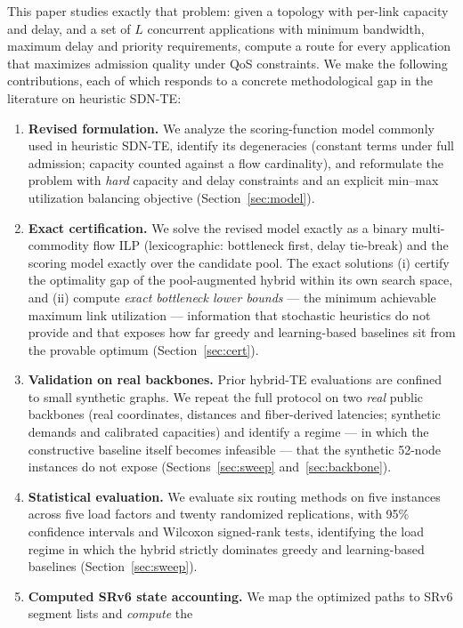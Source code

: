 \documentclass[journal]{IEEEtran}
\begin{document}
This paper studies exactly that problem: given a topology with per-link
capacity and delay, and a set of $L$ concurrent applications with minimum
bandwidth, maximum delay and priority requirements, compute a route for
every application that maximizes admission quality under QoS constraints.
We make the following contributions, each of which responds to a concrete
methodological gap in the literature on heuristic SDN-TE:
\begin{enumerate}
\item \textbf{Revised formulation.} We analyze the scoring-function model
commonly used in heuristic SDN-TE, identify its degeneracies (constant terms
under full admission; capacity counted against a flow cardinality), and
reformulate the problem with \emph{hard} capacity and delay constraints and
an explicit min--max utilization balancing objective
(Section~\ref{sec:model}).
\item \textbf{Exact certification.} We solve the revised model exactly as a
binary multi-commodity flow ILP (lexicographic: bottleneck first, delay
tie-break) and the scoring model exactly over the candidate pool. The exact
solutions (i) certify the optimality gap of the pool-augmented hybrid within
its own search space, and (ii) compute \emph{exact bottleneck lower bounds}
--- the minimum achievable maximum link utilization --- information that
stochastic heuristics do not provide and that exposes how far greedy and
learning-based baselines sit from the provable optimum (Section~\ref{sec:cert}).
\item \textbf{Validation on real backbones.} Prior hybrid-TE evaluations are
confined to small synthetic graphs. We repeat the full protocol on two
\emph{real} public backbones (real coordinates, distances and
fiber-derived latencies; synthetic demands and calibrated capacities) and
identify a regime --- in which the constructive baseline itself becomes
infeasible --- that the synthetic 52-node instances do not expose
(Sections~\ref{sec:sweep} and~\ref{sec:backbone}).
\item \textbf{Statistical evaluation.} We evaluate six routing methods on
five instances across five load factors and twenty randomized replications,
with 95\% confidence intervals and Wilcoxon signed-rank tests, identifying
the load regime in which the hybrid strictly dominates greedy and
learning-based baselines (Section~\ref{sec:sweep}).
\item \textbf{Computed SRv6 state accounting.} We map the optimized paths to
SRv6 segment lists \cite{rfc8402,rfc8754,rfc8986} and \emph{compute} the

\end{enumerate}
\end{document}
